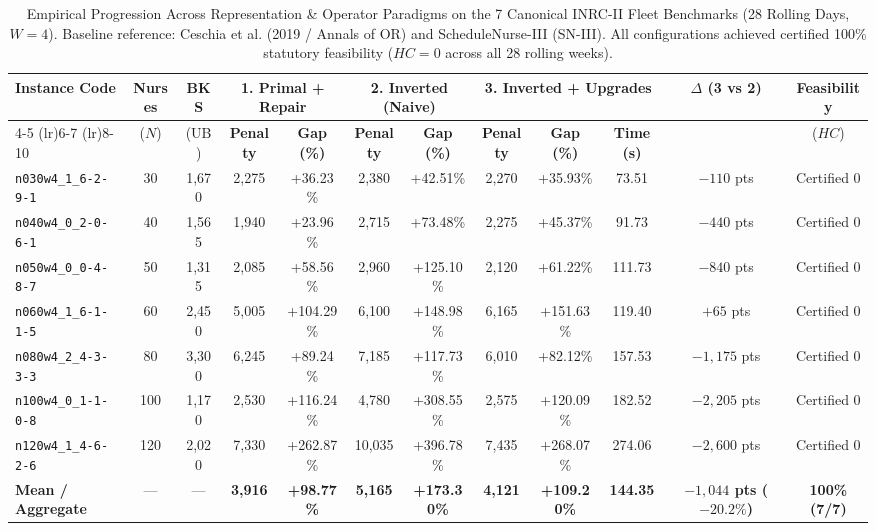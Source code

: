 \begin{table}[t]
\centering
\scriptsize
\setlength{\tabcolsep}{2.5pt}
\caption{Empirical Progression Across Representation \& Operator Paradigms on the 7 Canonical INRC-II Fleet Benchmarks (28 Rolling Days, $W=4$). Baseline reference: Ceschia et al. (2019 / Annals of OR) and ScheduleNurse-III (SN-III). All configurations achieved certified 100\% statutory feasibility ($HC = 0$ across all 28 rolling weeks).}
\label{tab:inrc_before_after_comparison}
\begin{tabular}{lccccccccccc}
\toprule
\multirow{2}{*}{\textbf{Instance Code}} & \multirow{2}{*}{\textbf{Nurses}} & \multirow{2}{*}{\textbf{BKS}} & \multicolumn{2}{c}{\textbf{1. Primal + Repair}} & \multicolumn{2}{c}{\textbf{2. Inverted (Naive)}} & \multicolumn{3}{c}{\textbf{3. Inverted + Upgrades}} & \multirow{2}{*}{\textbf{$\Delta$ (3 vs 2)}} & \multirow{2}{*}{\textbf{Feasibility}} \\
\cmidrule(lr){4-5} \cmidrule(lr){6-7} \cmidrule(lr){8-10}
& ($N$) & (UB) & \textbf{Penalty} & \textbf{Gap (\%)} & \textbf{Penalty} & \textbf{Gap (\%)} & \textbf{Penalty} & \textbf{Gap (\%)} & \textbf{Time (s)} & & ($HC$) \\
\midrule
\texttt{n030w4\_1\_6-2-9-1} &  30 & 1,670 & 2,275 & +36.23\% &  2,380 &  +42.51\% &  2,270 &  +35.93\% &  73.51 &  $-110$ pts   & Certified 0 \\
\texttt{n040w4\_0\_2-0-6-1} &  40 & 1,565 & 1,940 & +23.96\% &  2,715 &  +73.48\% &  2,275 &  +45.37\% &  91.73 &  $-440$ pts  & Certified 0 \\
\texttt{n050w4\_0\_0-4-8-7} &  50 & 1,315 & 2,085 & +58.56\% &  2,960 & +125.10\% &  2,120 &  +61.22\% & 111.73 &  $-840$ pts  & Certified 0 \\
\texttt{n060w4\_1\_6-1-1-5} &  60 & 2,450 & 5,005 & +104.29\% &  6,100 & +148.98\% &  6,165 & +151.63\% & 119.40 &   $+65$ pts  & Certified 0 \\
\texttt{n080w4\_2\_4-3-3-3} &  80 & 3,300 & 6,245 & +89.24\% &  7,185 & +117.73\% &  6,010 &  +82.12\% & 157.53 &  $-1,175$ pts & Certified 0 \\
\texttt{n100w4\_0\_1-1-0-8} & 100 & 1,170 & 2,530 & +116.24\% &  4,780 & +308.55\% &  2,575 & +120.09\% & 182.52 &  $-2,205$ pts & Certified 0 \\
\texttt{n120w4\_1\_4-6-2-6} & 120 & 2,020 & 7,330 & +262.87\% & 10,035 & +396.78\% &  7,435 & +268.07\% & 274.06 &  $-2,600$ pts & Certified 0 \\
\midrule
\textbf{Mean / Aggregate}    & ---  & ---   & \textbf{3,916} & \textbf{+98.77\%} &  \textbf{5,165} & \textbf{+173.30\%} &  \textbf{4,121} & \textbf{+109.20\%} & \textbf{144.35} & \textbf{$-1,044$ pts ($-20.2\%$)} & \textbf{100\% (7/7)} \\
\bottomrule
\end{tabular}
\end{table}
